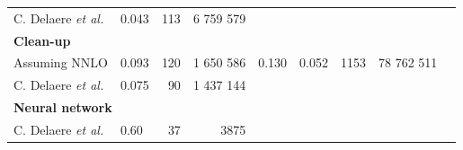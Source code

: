 \documentclass[10pt,a4paper]{article}
\newcommand{\level}[1]{ \multicolumn{5}{l}{\hspace{-1em}\textbf{#1}}}
\newcommand{\T}{\rule{0pt}{2.9ex}}       %
\newcommand{\B}{\rule[-1.3ex]{0pt}{0pt}} %
\newcommand{\sAN}{$\sigma_1$}
\newcommand{\etal}{\emph{et al.}}
\begin{document}
\begin{table}[t]
\begin{tabular}{@{\quad}llrrllrrr@{}}
	C. Delaere \etal       & 0.043 &    113  &   6 759 579 &       &       &         &              \\
	\level{Clean-up} \T\\
 	Assuming NNLO          & 0.093 &    120  &   1 650 586 & 0.130 & 0.052 &   1153  &  78 762 511  \\
	C. Delaere \etal       & 0.075 &     90  &   1 437 144 &       &       &         &              \\
	\level{Neural network} \T\\
	C. Delaere \etal       & 0.60  &     37  &        3875 &       &       &         &            \B\\
	\bottomrule
	
	\end{tabular}
\end{table}






\end{document}
